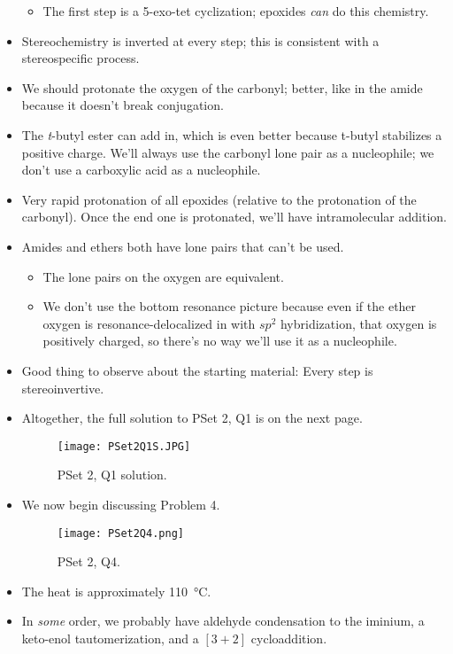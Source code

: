 \documentclass[../notes.tex]{subfiles}
\begin{document}
\begin{itemize}
\begin{itemize}
        \item The first step is a 5-exo-tet cyclization; epoxides \emph{can} do this chemistry.
    \end{itemize}
    \item Stereochemistry is inverted at every step; this is consistent with a stereospecific process.
    \item We should protonate the oxygen of the carbonyl; better, like in the amide because it doesn't break conjugation.
    \item The \emph{t}-butyl ester can add in, which is even better because t-butyl stabilizes a positive charge. We'll always use the carbonyl lone pair as a nucleophile; we don't use a carboxylic acid as a nucleophile.
    \item Very rapid protonation of all epoxides (relative to the protonation of the carbonyl). Once the end one is protonated, we'll have intramolecular addition.
    \item Amides and ethers both have lone pairs that can't be used.
    \begin{itemize}
        \item The lone pairs on the oxygen are equivalent.
        \item We don't use the bottom resonance picture because even if the ether oxygen is resonance-delocalized in with $sp^2$ hybridization, that oxygen is positively charged, so there's no way we'll use it as a nucleophile.
    \end{itemize}
    \item Good thing to observe about the starting material: Every step is stereoinvertive.
    \item Altogether, the full solution to PSet 2, Q1 is on the next page.
    \begin{figure}[h!]
        \centering
        \texttt{[image: PSet2Q1S.JPG]}
        \caption{PSet 2, Q1 solution.}
        \label{fig:PSet2Q1S}
    \end{figure}
    \pagebreak
    \item We now begin discussing Problem 4.
    \begin{figure}[h!]
        \centering
        \texttt{[image: PSet2Q4.png]}
        \caption{PSet 2, Q4.}
        \label{fig:PSet2Q4}
    \end{figure}
    \item The heat is approximately \SI{110}{\celsius}.
    \item In \emph{some} order, we probably have aldehyde condensation to the iminium, a keto-enol tautomerization, and a $[3+2]$ cycloaddition.

\end{itemize}
\end{document}
